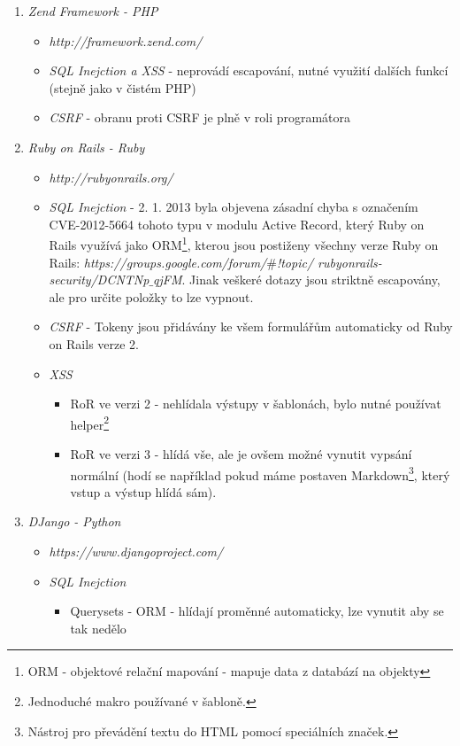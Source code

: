 \documentclass[12pt, a4paper]{report}
\begin{document}
\begin{enumerate}
\item \textit{Zend Framework - PHP} 
\begin{itemize}
\item \textit{http://framework.zend.com/}
\item \textit{SQL Inejction a XSS} - neprovádí escapování, nutné využití dalších funkcí (stejně jako v čistém PHP)
\item \textit{CSRF} - obranu proti CSRF je plně v roli programátora
\end{itemize}
\item \textit{Ruby on Rails - Ruby}
\begin{itemize}
\item \textit{http://rubyonrails.org/}
\item \textit{SQL Inejction} - 2. 1. 2013 byla objevena zásadní chyba s označením CVE-2012-5664 tohoto typu v modulu Active Record, který Ruby on Rails využívá jako ORM\footnote{ORM - objektové relační mapování - mapuje data z databází na objekty}, kterou jsou postiženy všechny verze Ruby on Rails: \textit{https://groups.google.com/forum/$\#$!topic/ rubyonrails-security/DCNTNp$\_$qjFM}. Jinak veškeré dotazy jsou striktně escapovány, ale pro určite položky to lze vypnout.
\item \textit{CSRF} - Tokeny jsou přidávány ke všem formulářům automaticky od Ruby on Rails verze 2.
\item \textit{XSS} 
\begin{itemize}
\item RoR ve verzi 2 - nehlídala výstupy v šablonách, bylo nutné používat helper\footnote{Jednoduché makro používané v šabloně.}
\item RoR ve verzi 3 - hlídá vše, ale je ovšem možné vynutit vypsání normální (hodí se například pokud máme  postaven Markdown\footnote{Nástroj pro převádění textu do HTML pomocí speciálních značek.}, který vstup a výstup hlídá sám).
\end{itemize}
\end{itemize} 
\item \textit{DJango - Python}
\begin{itemize}
\item \textit{https://www.djangoproject.com/}
\item \textit{SQL Inejction}
\begin{itemize}
\item Querysets - ORM - hlídají proměnné automaticky, lze vynutit aby se tak nedělo

\end{itemize}
\end{itemize}
\end{enumerate}
\end{document}
